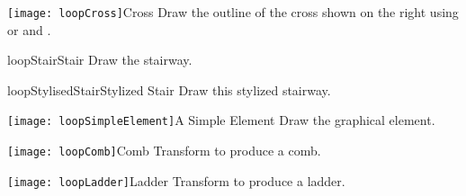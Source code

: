 \begin{exofigwithsizeandtitle}{\texttt{[image: loopCross]}}{Cross} \label{exo:redcross}
Draw the outline of the cross shown on the right using \turnLeft or \turnRight and
\timesRepeat.
\end{exofigwithsizeandtitle}


\begin{exofigwithtitle}{loopStair}{Stair}\label{exo:stair}
Draw the \newcommand{\replace}[2]{following stair}{stairway}.
\end{exofigwithtitle}



\begin{exofigwithtitle}{loopStylisedStair}{Stylized Stair}\label{exo:stylizedstair}
Draw \newcommand{\replace}[2]{the following}{this} stylized \newcommand{\replace}[2]{stair}{stairway}.
\end{exofigwithtitle}

\begin{exofigwithsizeandtitle}{\texttt{[image: loopSimpleElement]}}{A Simple Element}\label{exo:element}
Draw the \newcommand{\remove}[1]{following} graphical element.
\end{exofigwithsizeandtitle}




\begin{exofigwithsizeandtitle}[0.3]{\texttt{[image: loopComb]}}{Comb}\label{exo:comb}
Transform \newcommand{\remove}[1]{the}  to produce a comb.
\end{exofigwithsizeandtitle}



\begin{exofigwithsizeandtitle}{\texttt{[image: loopLadder]}}{Ladder}\label{exo:ladder}
Transform \newcommand{\remove}[1]{the}  to produce a ladder.
\end{exofigwithsizeandtitle}


